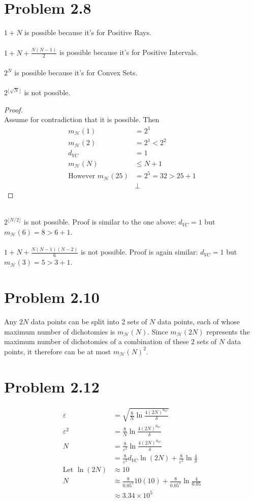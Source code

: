 \documentclass{article}
\begin{document}
	\section*{Problem 2.8}
	$1+N$ is possible because it's for Positive Rays.\\\\
	$1 + N + \frac{N(N-1)}2$ is possible because it's for Positive Intervals.\\\\
	$2^N$ is possible because it's for Convex Sets.\\\\
	$2^{\lfloor \sqrt N \rfloor}$ is not possible.
	\begin{proof}\ \\
	Assume for contradiction that it is possible. Then
		\begin{align*}
			m_{\mathcal H}(1) &= 2^1\\
			m_{\mathcal H}(2) &= 2^1 < 2 ^ 2\\
			d_{VC} &= 1\\
			m_{\mathcal H}(N) &\leq N+1\\
			\text{However }m_{\mathcal H}(25) &= 2^5 = 32 > 25 + 1\\
			&\bot
		\end{align*}
	\end{proof}\ \\
	$2^{\lfloor N/2 \rfloor}$ is not possible. Proof is similar to the one above: $d_{VC} = 1$ but $m_{\mathcal H}(6) = 8 > 6+1$.\\\\	
	$1 + N + \frac{N(N-1)(N-2)}6$ is not possible. Proof is again similar: $d_{VC} = 1$ but $m_{\mathcal H}(3) = 5 > 3 + 1$.
	
	\section*{Problem 2.10}
		Any $2N$ data points can be split into 2 sets of $N$ data points, each of whose maximum number of dichotomies is $m_{\mathcal H}(N)$.  Since $m_{\mathcal H}(2N)$ represents the maximum number of dichotomies of a combination of these 2 sets of $N$ data points, it therefore can be at most $m_{\mathcal H}(N)^2$.
		
	\section*{Problem 2.12}
		\begin{align*}
			\varepsilon &= \sqrt{\frac8N \ln \frac{4(2N)^{d_{VC}}}\delta}\\
			\varepsilon^2 &= \frac8N \ln \frac{4(2N)^{d_{VC}}}\delta\\
			N &= \frac8{\varepsilon^2} \ln \frac{4(2N)^{d_{VC}}}\delta\\
			&= \frac8{\varepsilon^2}d_{VC}\ln(2N) + \frac8{\varepsilon^2}\ln\frac4\delta\\
			\text{Let }\ln(2N) &\approx 10\\
			N &\approx  \frac8{0.05^2}10(10) + \frac8{0.05^2}\ln\frac4{0.05}\\
			&\approx \boxed{3.34 \times 10^5}
		\end{align*}
\end{document}
